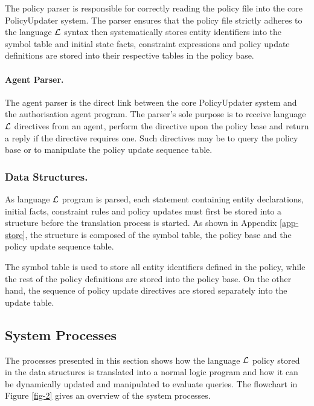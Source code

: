 \documentclass[global,twocolumn,final]{svjour}
\begin{document}
          The policy parser is responsible for correctly reading the policy
          file into the core PolicyUpdater system. The parser ensures that
          the policy file strictly adheres to the language $\cal{L}$ syntax
          then systematically stores entity identifiers into the symbol table
          and initial state facts, constraint expressions and policy update
          definitions are stored into their respective tables in the policy
          base.

        \paragraph{Agent Parser.}

          The agent parser is the direct link between the core PolicyUpdater
          system and the authorisation agent program. The parser's sole purpose
          is to receive language $\cal{L}$ directives from an agent, perform
          the directive upon the policy base and return a reply if the
          directive requires one. Such directives may be to query the policy
          base or to manipulate the policy update sequence table.

      \subsubsection{Data Structures.}

        As language ${\cal L}$ program is parsed, each statement containing
        entity declarations, initial facts, constraint rules and policy
        updates must first be stored into a structure before the translation
        process is started. As shown in Appendix \ref{app-store}, the structure
        is composed of the symbol table, the policy base and the policy update
        sequence table.

        The symbol table is used to store all entity identifiers defined in the
        policy, while the rest of the policy definitions are stored into the
        policy base. On the other hand, the sequence of policy update
        directives are stored separately into the update table.

    \subsection{System Processes}

      The processes presented in this section shows how the language
      ${\cal L}$ policy stored in the data structures is translated into a
      normal logic program and how it can be dynamically updated and
      manipulated to evaluate queries. The flowchart in Figure \ref{fig-2}
      gives an overview of the system processes.
\end{document}
